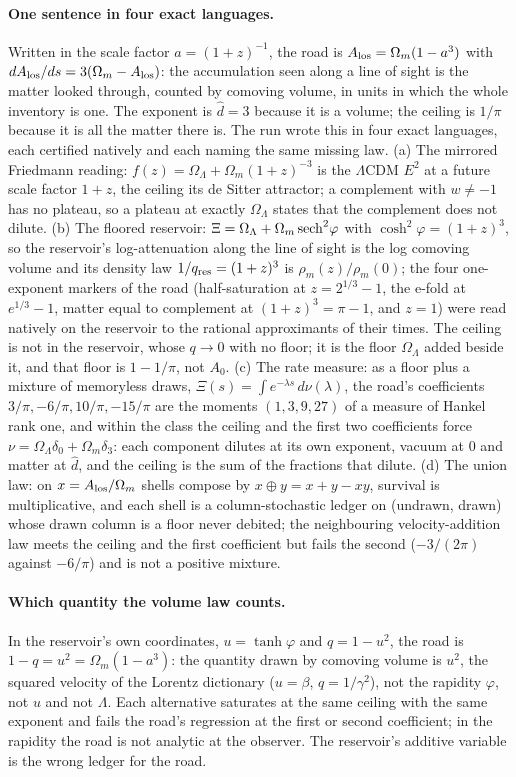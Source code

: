 \paragraph*{One sentence in four exact languages.} Written in the scale factor $a=(1+z)^{-1}$, the road is $A_{\rm los}=\Omega_m(1-a^3)$ with $dA_{\rm los}/ds=3(\Omega_m-A_{\rm los})$: the accumulation seen along a line of sight is the matter looked through, counted by comoving volume, in units in which the whole inventory is one. The exponent is $\hat d=3$ because it is a volume; the ceiling is $1/\pi$ because it is all the matter there is. The run wrote this in four exact languages, each certified natively and each naming the same missing law. (a) The mirrored Friedmann reading: $f(z)=\Omega_\Lambda+\Omega_m(1+z)^{-3}$ is the $\Lambda$CDM $E^2$ at a future scale factor $1+z$, the ceiling its de Sitter attractor; a complement with $w\neq-1$ has no plateau, so a plateau at exactly $\Omega_\Lambda$ states that the complement does not dilute. (b) The floored reservoir: $\Xi=\Omega_\Lambda+\Omega_m\,{\rm sech}^2\varphi$ with $\cosh^2\varphi=(1+z)^3$, so the reservoir's log-attenuation along the line of sight is the log comoving volume and its density law $1/q_{\rm res}=(1+z)^3$ is $\rho_m(z)/\rho_m(0)$; the four one-exponent markers of the road (half-saturation at $z=2^{1/3}-1$, the e-fold at $e^{1/3}-1$, matter equal to complement at $(1+z)^3=\pi-1$, and $z=1$) were read natively on the reservoir to the rational approximants of their times. The ceiling is not in the reservoir, whose $q\to0$ with no floor; it is the floor $\Omega_\Lambda$ added beside it, and that floor is $1-1/\pi$, not $A_0$. (c) The rate measure: as a floor plus a mixture of memoryless draws, $\Xi(s)=\int e^{-\lambda s}\,d\nu(\lambda)$, the road's coefficients $3/\pi,-6/\pi,10/\pi,-15/\pi$ are the moments $(1,3,9,27)$ of a measure of Hankel rank one, and within the class the ceiling and the first two coefficients force $\nu=\Omega_\Lambda\delta_0+\Omega_m\delta_3$: each component dilutes at its own exponent, vacuum at $0$ and matter at $\hat d$, and the ceiling is the sum of the fractions that dilute. (d) The union law: on $x=A_{\rm los}/\Omega_m$ shells compose by $x\oplus y=x+y-xy$, survival is multiplicative, and each shell is a column-stochastic ledger on (undrawn, drawn) whose drawn column is a floor never debited; the neighbouring velocity-addition law meets the ceiling and the first coefficient but fails the second ($-3/(2\pi)$ against $-6/\pi$) and is not a positive mixture.

\paragraph*{Which quantity the volume law counts.} In the reservoir's own coordinates, $u=\tanh\varphi$ and $q=1-u^2$, the road is $1-q=u^2=\Omega_m(1-a^3)$: the quantity drawn by comoving volume is $u^2$, the squared velocity of the Lorentz dictionary ($u=\beta$, $q=1/\gamma^2$), not the rapidity $\varphi$, not $u$ and not $\Lambda$. Each alternative saturates at the same ceiling with the same exponent and fails the road's regression at the first or second coefficient; in the rapidity the road is not analytic at the observer. The reservoir's additive variable is the wrong ledger for the road.

